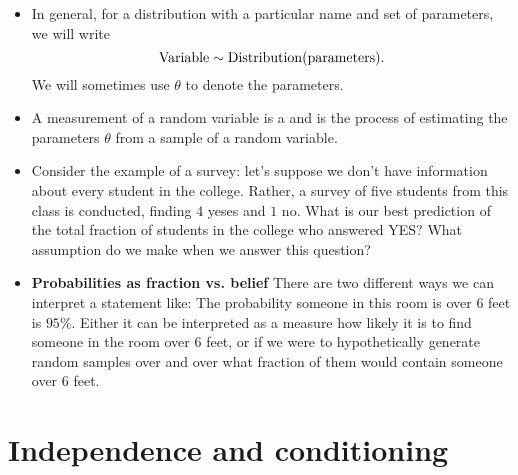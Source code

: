 \begin{itemize}
\begin{example}
\end{example}


\item  In general, for a distribution with a particular name and set of parameters, we will write 
\begin{equation*}
{\rm Variable} \sim {\rm Distribution}({\rm parameters}).
\end{equation*}
We will sometimes use $\theta$ to denote the parameters. 
\item A measurement of a random variable is a  and   is the process of estimating the parameters $\theta$ from a sample of a random variable. 
\item Consider the example of a survey: let's suppose we don't have information about every student in the college. Rather, a survey of five students from this class is conducted, finding $4$ yeses and $1$ no. What is our best prediction of the total fraction of students in the college who answered YES? What assumption do we make when we answer this question? 
\item {\bf Probabilities as fraction vs. belief}
There are two different ways we can interpret a statement like: The probability someone in this room is over $6$ feet is $95\%$. Either it can be interpreted as a measure how likely it is to find someone in the room over $6$ feet, or if we were to hypothetically generate random samples over and over what fraction of them would contain someone over $6$ feet. 
\end{itemize}





\section{Independence and conditioning \cite[Sec. 2.8.1]{tabak}}



